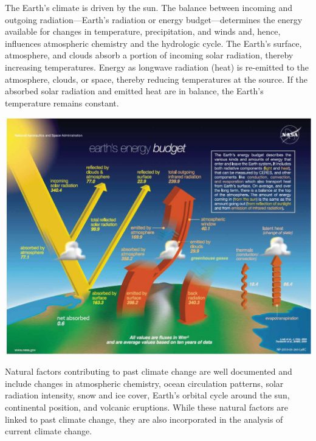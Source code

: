 \documentclass[
  letterpaper,
]{scrreprt}\usepackage{amsmath,amssymb}
\begin{document}
\begin{tcolorbox}[standard jigsaw,colbacktitle=quarto-callout-note-color!10!white, bottomtitle=1mm, toptitle=1mm, rightrule=.15mm, leftrule=.75mm, titlerule=0mm, title={The Earth's Energy Budget}, arc=.35mm, bottomrule=.15mm, colframe=quarto-callout-note-color-frame, opacityback=0, opacitybacktitle=0.6, colback=white, left=2mm, toprule=.15mm, coltitle=black]
The Earth's climate is driven by the sun. The balance between incoming
and outgoing radiation---Earth's radiation or energy budget---determines
the energy available for changes in temperature, precipitation, and
winds and, hence, influences atmospheric chemistry and the hydrologic
cycle. The Earth's surface, atmosphere, and clouds absorb a portion of
incoming solar radiation, thereby increasing temperatures. Energy as
longwave radiation (heat) is re-emitted to the atmosphere, clouds, or
space, thereby reducing temperatures at the source. If the absorbed
solar radiation and emitted heat are in balance, the Earth's temperature
remains constant.

\includegraphics{./assets/energy-budget.jpg}
\end{tcolorbox}

Natural factors contributing to past climate change are well documented
and include changes in atmospheric chemistry, ocean circulation
patterns, solar radiation intensity, snow and ice cover, Earth's orbital
cycle around the sun, continental position, and volcanic eruptions.
While these natural factors are linked to past climate change, they are
also incorporated in the analysis of current climate change.
\end{document}
